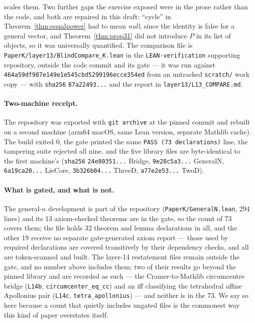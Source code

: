 \documentclass[11pt]{article}
\theoremstyle{definition}
\theoremstyle{remark}
\newcommand{\pkcommit}{464a59df987e149e1e545cbd5299196ecce354ed}
\begin{document}
 scales them. Two further gaps the exercise exposed were in the prose rather
than the code, and both are repaired in this draft: ``cycle'' in
Theorem~\ref{thm:equalpower} had to mean \emph{null}, since the identity is false for a general
vector, and Theorem~\ref{thm:prop31} did not introduce $P$ in its list of objects, so it was
universally quantified. The comparison file is \texttt{PaperK/layer13/BlindCompare\_K.lean} in the
\texttt{LEAN-verification} supporting repository, outside the code commit and its gate --- it was run
against \texttt{\pkcommit} from an untracked \texttt{scratch/} work copy --- with
\texttt{sha256} \texttt{87a22493...} and the report in
\texttt{layer13/L13\_COMPARE.md}.

\paragraph{Two-machine receipt.} The repository was exported with \texttt{git archive} at the
pinned commit and rebuilt on a second machine (arm64 macOS, same Lean version, separate Mathlib
cache). The build exited 0, the gate printed the same \texttt{PASS (73 declarations)} line, the
tampering suite rejected all nine, and the five library files are byte-identical to the first
machine's (\texttt{sha256} \texttt{24e80351...} Bridge, \texttt{9e28c5a3...} GeneralN,
\texttt{6a19ca20...} LieCore, \texttt{3b326b04...} ThreeD, \texttt{a77e2e53...} TwoD).

\paragraph{What is gated, and what is not.} The general-$n$ development is part of the repository
(\texttt{PaperK/GeneralN.lean}, 294 lines) and its 13 axiom-checked theorems are in the gate, so the
count of 73 covers them; the file holds 32 theorem and lemma declarations in all, and the other 19
receive no separate gate-generated axiom report --- those used by required declarations are covered
transitively by their dependency checks, and all are token-scanned and built. The layer-14
restatement files remain outside the gate, and no number above includes them; two of their results go
beyond the pinned library and are recorded as such --- the Cramer-to-Mathlib circumcentre bridge
(\texttt{L14b}, \texttt{circumcenter\_eq\_cc}) and an iff classifying the tetrahedral affine
Apollonius pair (\texttt{L14c}, \texttt{tetra\_apollonius}) --- and neither is in the 73. We say so here because a count that quietly includes
ungated files is the commonest way this kind of paper overstates itself.
\end{document}
